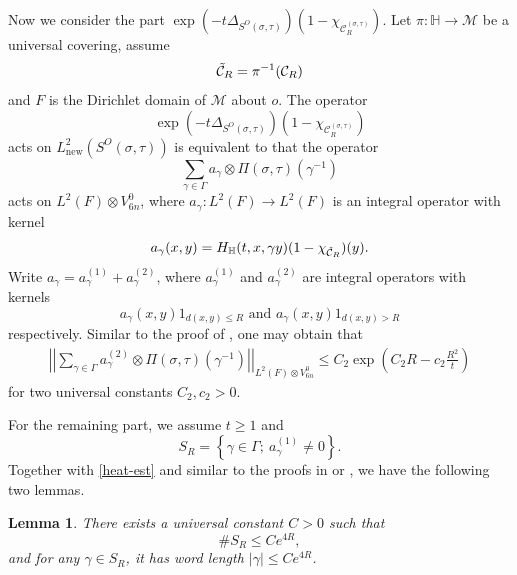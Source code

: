 \documentclass{amsart}
\theoremstyle{plain}
\newtheorem{lemma}[theorem]{Lemma}
\theoremstyle{definition}
\theoremstyle{remark}
\begin{document}
Now we consider the part $\exp\left(-t\Delta_{S^O(\sigma,\tau)}\right)\left(1-\chi_{\mathcal{C}_R^{(\sigma,\tau)}}\right)$.
Let $\pi:\mathbb{H}\to\mathcal{M}$ be a universal covering, assume
$$\Tilde{\mathcal{C}}_R=\pi^{-1}(\mathcal{C}_R)$$
and $F$ is the Dirichlet domain of $\mathcal{M}$ about $o$. 
The operator $$\exp\left(-t\Delta_{S^O(\sigma,\tau)}\right)\left(1-\chi_{\mathcal{C}_R^{(\sigma,\tau)}}\right)$$ acts on $L^2_{\text{new}}(S^O(\sigma,\tau))$ is equivalent to that the operator
$$\sum\limits_{\gamma\in\Gamma}a_{\gamma}\otimes\Pi(\sigma,\tau)(\gamma^{-1})$$
acts on $L^2(F)\otimes V_{6n}^0$, where $a_\gamma:L^2(F)\to L^2(F)$ is an integral operator with kernel 
$$a_\gamma(x,y)=H_{\mathbb{H}}(t,x,\gamma y)(1-\chi_{\Tilde{\mathcal{C}}_R})(y).$$
Write $a_\gamma=a_\gamma^{(1)}+a_\gamma^{(2)}$, where $a_\gamma^{(1)}$ and $a_{\gamma}^{(2)}$ are integral operators with kernels $$a_\gamma(x,y) 1_{d(x,y)\leq R}\text{ and }a_\gamma(x,y) 1_{d(x,y)>R}$$ respectively. 
Similar to the proof of \cite[Section 4.5]{Moy25}, one may obtain that
\begin{equation}
\begin{aligned}\label{e-moy}
\left|\left|\sum\limits_{\gamma\in\Gamma}a_{\gamma}^{(2)}\otimes\Pi(\sigma,\tau)(\gamma^{-1})\right|\right|_{L^2(F)\otimes V_{6n}^0}\leq C_2\exp\left(C_2R-c_2\frac{R^2}{t}\right)
\end{aligned}
\end{equation}
for two universal constants $C_2,c_2>0$. 

For the remaining part, we assume $t\geq 1$ 
and
$$S_R=\left\{\gamma\in\Gamma;\ a_\gamma^{(1)}\neq 0\right\}.$$
Together with \eqref{heat-est} and similar to the proofs in \cite{HM23} or \cite{HMTcov}, we have the following two lemmas.
\begin{lemma}\label{l-1}
    There exists a universal constant $C>0$ such that 
    $$\#S_R\leq Ce^{4R},$$
and for any $\gamma\in S_R$, it has word length $|\gamma|\leq Ce^{4R}$.
\end{lemma}
 
\end{document}
